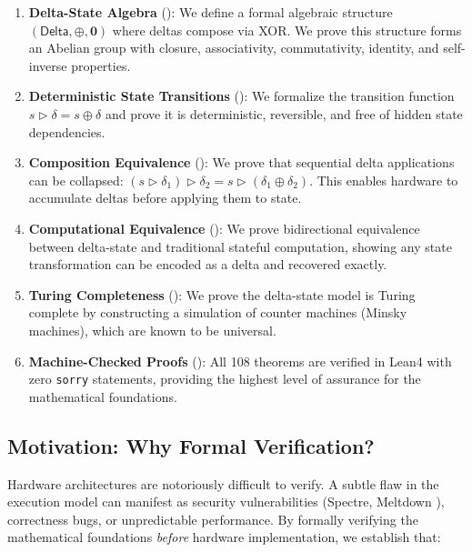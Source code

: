 \documentclass[11pt,letterpaper]{article}
\theoremstyle{plain}
\theoremstyle{definition}
\theoremstyle{remark}
\newcommand{\dcompose}{\oplus}           %
\newcommand{\dzero}{\mathbf{0}}          %
\newcommand{\transition}{\triangleright} %
\newcommand{\DeltaType}{\mathsf{Delta}}
\begin{document}
\begin{enumerate}
    \item \textbf{Delta-State Algebra} (): We define a formal algebraic structure $(\DeltaType, \dcompose, \dzero)$ where deltas compose via XOR. We prove this structure forms an Abelian group with closure, associativity, commutativity, identity, and self-inverse properties.
    
    \item \textbf{Deterministic State Transitions} (): We formalize the transition function $s \transition \delta = s \oplus \delta$ and prove it is deterministic, reversible, and free of hidden state dependencies.
    
    \item \textbf{Composition Equivalence} (): We prove that sequential delta applications can be collapsed: $(s \transition \delta_1) \transition \delta_2 = s \transition (\delta_1 \dcompose \delta_2)$. This enables hardware to accumulate deltas before applying them to state.
    
    \item \textbf{Computational Equivalence} (): We prove bidirectional equivalence between delta-state and traditional stateful computation, showing any state transformation can be encoded as a delta and recovered exactly.
    
    \item \textbf{Turing Completeness} (): We prove the delta-state model is Turing complete by constructing a simulation of counter machines (Minsky machines), which are known to be universal.
    
    \item \textbf{Machine-Checked Proofs} (): All 108 theorems are verified in Lean4 \cite{moura2021lean4} with zero \texttt{sorry} statements, providing the highest level of assurance for the mathematical foundations.
\end{enumerate}

\subsection{Motivation: Why Formal Verification?}

Hardware architectures are notoriously difficult to verify. A subtle flaw in the execution model can manifest as security vulnerabilities (Spectre, Meltdown \cite{kocher2019spectre,lipp2018meltdown}), correctness bugs, or unpredictable performance. By formally verifying the mathematical foundations \emph{before} hardware implementation, we establish that:
\end{document}
